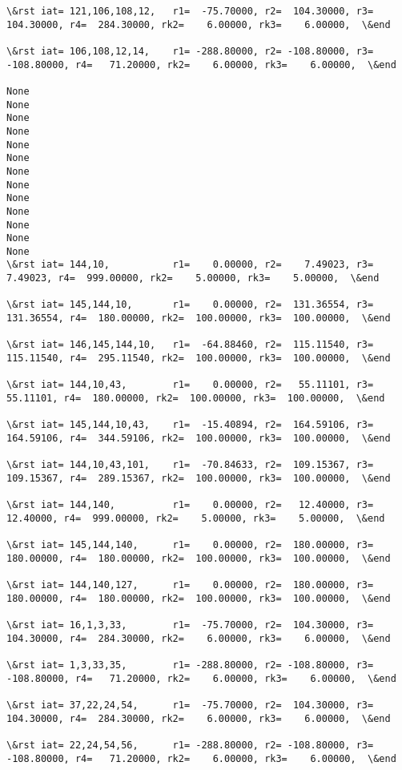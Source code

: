 \documentclass[11pt]{article}
\begin{document}
\begin{Verbatim}[commandchars=\\\{\}]
\&rst iat= 121,106,108,12,   r1=  -75.70000, r2=  104.30000, r3=  104.30000, r4=  284.30000, rk2=    6.00000, rk3=    6.00000,  \&end

\&rst iat= 106,108,12,14,    r1= -288.80000, r2= -108.80000, r3= -108.80000, r4=   71.20000, rk2=    6.00000, rk3=    6.00000,  \&end

None
None
None
None
None
None
None
None
None
None
None
None
None
\&rst iat= 144,10,           r1=    0.00000, r2=    7.49023, r3=    7.49023, r4=  999.00000, rk2=    5.00000, rk3=    5.00000,  \&end

\&rst iat= 145,144,10,       r1=    0.00000, r2=  131.36554, r3=  131.36554, r4=  180.00000, rk2=  100.00000, rk3=  100.00000,  \&end

\&rst iat= 146,145,144,10,   r1=  -64.88460, r2=  115.11540, r3=  115.11540, r4=  295.11540, rk2=  100.00000, rk3=  100.00000,  \&end

\&rst iat= 144,10,43,        r1=    0.00000, r2=   55.11101, r3=   55.11101, r4=  180.00000, rk2=  100.00000, rk3=  100.00000,  \&end

\&rst iat= 145,144,10,43,    r1=  -15.40894, r2=  164.59106, r3=  164.59106, r4=  344.59106, rk2=  100.00000, rk3=  100.00000,  \&end

\&rst iat= 144,10,43,101,    r1=  -70.84633, r2=  109.15367, r3=  109.15367, r4=  289.15367, rk2=  100.00000, rk3=  100.00000,  \&end

\&rst iat= 144,140,          r1=    0.00000, r2=   12.40000, r3=   12.40000, r4=  999.00000, rk2=    5.00000, rk3=    5.00000,  \&end

\&rst iat= 145,144,140,      r1=    0.00000, r2=  180.00000, r3=  180.00000, r4=  180.00000, rk2=  100.00000, rk3=  100.00000,  \&end

\&rst iat= 144,140,127,      r1=    0.00000, r2=  180.00000, r3=  180.00000, r4=  180.00000, rk2=  100.00000, rk3=  100.00000,  \&end

\&rst iat= 16,1,3,33,        r1=  -75.70000, r2=  104.30000, r3=  104.30000, r4=  284.30000, rk2=    6.00000, rk3=    6.00000,  \&end

\&rst iat= 1,3,33,35,        r1= -288.80000, r2= -108.80000, r3= -108.80000, r4=   71.20000, rk2=    6.00000, rk3=    6.00000,  \&end

\&rst iat= 37,22,24,54,      r1=  -75.70000, r2=  104.30000, r3=  104.30000, r4=  284.30000, rk2=    6.00000, rk3=    6.00000,  \&end

\&rst iat= 22,24,54,56,      r1= -288.80000, r2= -108.80000, r3= -108.80000, r4=   71.20000, rk2=    6.00000, rk3=    6.00000,  \&end


\end{Verbatim}
\end{document}
